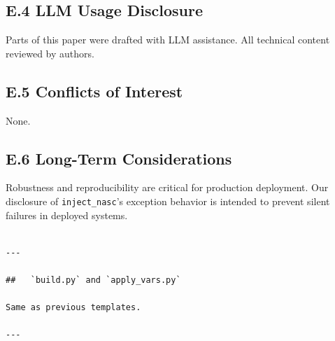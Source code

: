 \subsection{E.4 LLM Usage Disclosure}

Parts of this paper were drafted with LLM assistance. All technical content 
reviewed by authors.

\subsection{E.5 Conflicts of Interest}

None.

\subsection{E.6 Long-Term Considerations}

Robustness and reproducibility are critical for production deployment. 
Our disclosure of \texttt{inject\_nasc}'s exception behavior is intended to 
prevent silent failures in deployed systems.
\begin{lstlisting}

---

##   `build.py` and `apply_vars.py`

Same as previous templates.

---
\end{lstlisting}